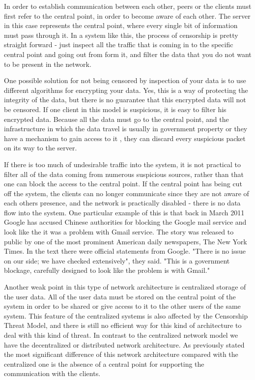 In order to establish communication between each other, peers or the clients must first refer to the central point, in order to become aware of each other. The server in this case represents the central point, where every single bit of information must pass through it. In a system like this, the process of censorship is pretty straight forward - just inspect all the traffic that is coming in to the specific central point and going out from form it, and filter the data that you do not want to be present in the network. 

One possible solution for not being censored by inspection of your data is to use different algorithms for encrypting your data. Yes, this is a way of protecting the integrity of the data, but there is no guarantee that this encrypted data will not be censored. If one client in this model is suspicious, it is easy to filter his encrypted data. Because all the data must go to the central point, and the infrastructure in which the data travel is usually in government property or they have a mechanism to gain access to it \cite{dianotti2011}, they can discard every suspicious packet on its way to the server.

If there is too much of undesirable traffic into the system, it is not practical to filter all of the data coming from numerous suspicious sources, rather than that one can block the access to the central point. If the central point has being cut off the system, the clients can no longer communicate since they are not aware of each others presence, and the network is practically disabled - there is no data flow into the system. One particular example of this is that back in March 2011 Google has accused Chinese authorities for blocking the Google mail service and look like the it was a problem with Gmail service. The story was released to public by one of the most prominent American daily newspapers, The New York Times. In the text there were official statements from Google. "There is no issue on our side; we have checked extensively", they said. "This is a government blockage, carefully designed to look like the problem is with Gmail." \cite{web:newyorktimes}

Another weak point in this type of network architecture is centralized storage of the user data. All of the user data must be stored on the central point of the system in order to be shared or give access to it to the other users of the same system. This feature of the centralized systems is also affected by the Censorship Threat Model, and there is still no efficient way for this kind of architecture to deal with this kind of threat.
In contrast to the centralized network model we have the decentralized or distributed network architecture. As previously stated the most significant difference of this network architecture compared with the centralized one is the absence of a central point for supporting the communication with the clients. 

